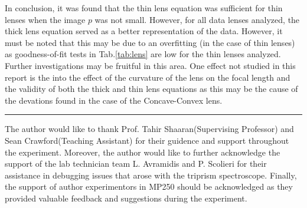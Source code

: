 \documentclass[aip, cp, amsmath, amssymb, reprint, nofootinbib]{revtex4-2}
\newcommand\advname{Tahir Shaaran\space} %
\newcommand\taname{Sean Crawford\space} %
\begin{document}
        In conclusion, it was found that the thin lens equation was sufficient for thin lenses when the image $p$ was not small. However, for all data lenses analyzed, the thick lens equation served as a better representation of the data. However, it must be noted that this may be due to an overfitting (in the case of thin lenses) as goodness-of-fit tests in Tab.\ref{tab:lens} are low for the thin lenses analyzed. 
        Further investigations may be fruitful in this area. One effect not studied in this report is the into the effect of the curvature of the lens on the focal length and the validity of both the thick and thin lens equations as this may be the cause of the devations found in the case of the Concave-Convex lens.
\onecolumngrid
\begin{center}
    \vspace{0.8cm}
    \noindent\rule{0.9\textwidth}{0.5pt}
\end{center}

\begin{acknowledgments}
    The author would like to thank Prof. \advname (Supervising Professor) and \taname (Teaching Assistant) for their guidence and support throughout the experiment. Moreover, the author would like to further acknowledge the support of the lab technician team L. Avramidis and P. Scolieri for their assistance in debugging issues that arose with the triprism spectroscope. Finally, the support of author experimentors in MP250 should be acknowledged as they provided valuable feedback and suggestions during the experiment.
\end{acknowledgments}





\end{document}
